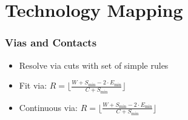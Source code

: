 \documentclass[aspectratio=169, dvipsnames, x11names, svgnames, 11pt]{beamer}
\begin{document}
\section{Technology Mapping}
\begin{frame}
    \frametitle{Vias and Contacts}
    \begin{itemize}
        \item Resolve via cuts with set of simple rules
        \item Fit via: $R = \biggl\lfloor\frac{W + S_{\mathrm{min}} - 2 \cdot E_{\mathrm{min}}}{C + S_{\mathrm{min}}}\biggr\rfloor$
        \item Continuous via: $R = \biggl\lfloor\frac{W + S_{\mathrm{min}} - 2 \cdot E_{\mathrm{min}}}{C + S_{\mathrm{min}}}\biggr\rfloor$
    \end{itemize}
    

\end{frame}
\end{document}
